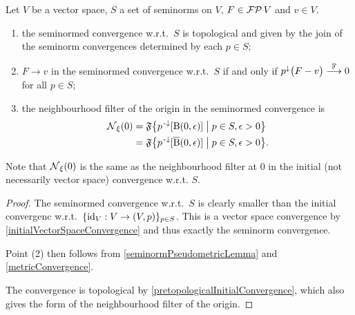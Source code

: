 \begin{proposition} \label{initialSeminormConvergence}
Let $V$ be a vector space, $S$ a set of seminorms on $V$, $F\in\operatorname{\mathcal{FP}}{V}$ and $v\in V$.
\begin{enumerate}
\item the seminormed convergence w.r.t.\ $S$ is topological and given by the join of the seminorm convergences determined by each $p\in S$;
\item $F\to v$ in the seminormed convergence w.r.t.\ $S$ \textup{if and only if} $p^{\downarrow}\big(F-v\big)\overset{\mathbb{F}}{\longrightarrow} 0$ for all $p\in S$;
\item the neighbourhood filter of the origin in the seminormed convergence is
\begin{align*}
\neighbourhood_\xi(0) &= \mathfrak{F}\setbuilder{p^\preimf[\ball(0,\epsilon)]}{p\in S, \epsilon > 0} \\
&= \mathfrak{F}\setbuilder{p^\preimf[\cball(0,\epsilon)]}{p\in S, \epsilon > 0}.
\end{align*}
\end{enumerate}
\end{proposition}
Note that $\operatorname{\mathcal{N}}_\xi(0)$ is the same as the neighbourhood filter at $0$ in the initial (not necessarily vector space) convergence w.r.t. $S$.
\begin{proof}
The seminormed convergence w.r.t.\ $S$ is clearly smaller than the initial convergenc w.r.t.\ $\{\id_V: V\to \sSet{V,p}\}_{p\in S}$. This is a vector space convergence by \ref{initialVectorSpaceConvergence} and thus exactly the seminorm convergence. 

Point (2) then follows from \ref{seminormPseudometricLemma} and \ref{metricConvergence}.

The convergence is topological by \ref{pretopologicalInitialConvergence}, which also gives the form of the neighbourhood filter of the origin.
\end{proof}

